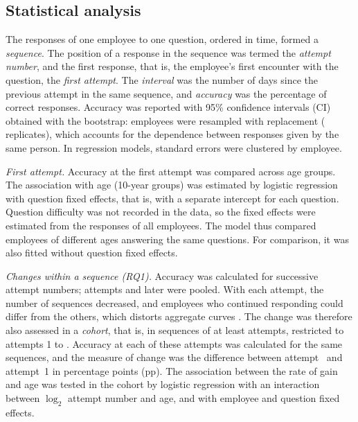 \subsection{Statistical analysis}
\label{sec:analiza}
The responses of one employee to one question, ordered in time, formed a \emph{sequence}. The position
of a response in the sequence was termed the \emph{attempt number}, and the first response, that is,
the employee's first encounter with the question, the \emph{first attempt}. The \emph{interval} was the
number of days since the previous attempt in the same sequence, and \emph{accuracy} was the percentage
of correct responses. Accuracy was reported with 95\% confidence intervals (CI) obtained with the
bootstrap: employees were resampled with replacement (\BootReps{} replicates), which accounts for the
dependence between responses given by the same person. In regression models, standard errors were
clustered by employee.

\emph{First attempt.} Accuracy at the first attempt was compared across age groups. The association
with age (10-year groups) was estimated by logistic regression with question fixed effects, that is,
with a separate intercept for each question. Question difficulty was not recorded in the data, so the
fixed effects were estimated from the responses of all employees. The model thus compared employees of
different ages answering the same questions. For comparison, it was also fitted without question fixed
effects.

\emph{Changes within a sequence (RQ1).} Accuracy was calculated for successive attempt numbers;
attempts \MaxAttemptPooled{} and later were pooled. With each attempt, the number of sequences
decreased, and employees who continued responding could differ from the others, which distorts
aggregate curves \citep{murray2013}. The change was therefore also assessed in a \emph{cohort}, that
is, in sequences of at least \CohortK{} attempts, restricted to attempts 1 to \CohortK{}. Accuracy at
each of these attempts was calculated for the same sequences, and the measure of change was the
difference between attempt~\CohortK{} and attempt~1 in percentage points (pp).
The association between the rate of gain and age was tested in the cohort by logistic regression with
an interaction between $\log_2$ attempt number and age, and with employee and question fixed effects.

